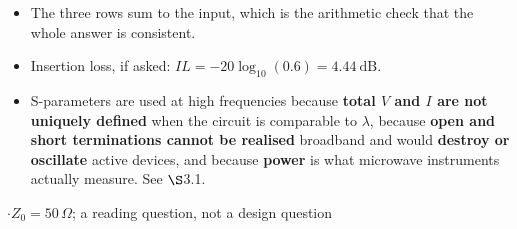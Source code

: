 \vspace{2pt}
\begin{itemize}
  \item The three rows sum to the input, which is the arithmetic check that the whole
    answer is consistent.
  \item Insertion loss, if asked: $IL = -20\log_{10}(0.6) = \boxed{4.44\ \text{dB}}$.
\end{itemize}
\begin{itemize}
  \item S-parameters are used at high frequencies because \textbf{total $V$ and $I$ are
    not uniquely defined} when the circuit is comparable to $\lambda$, because
    \textbf{open and short terminations cannot be realised} broadband and would
    \textbf{destroy or oscillate} active devices, and because \textbf{power} is what
    microwave instruments actually measure. See $\S$3.1.
\end{itemize}

\vspace{2pt}

{\color{sub}\footnotesize {} \gap$\cdot$\gap $Z_0 = 50\,\Omega$; a reading question, not a design question}

